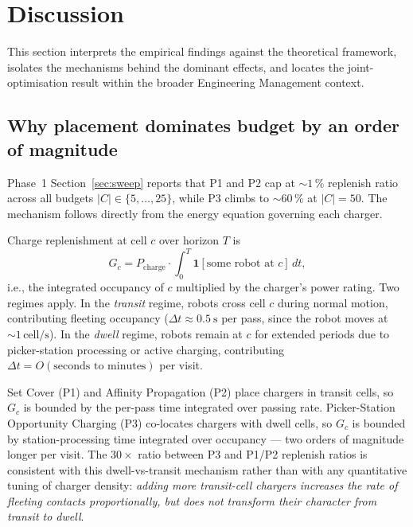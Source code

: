 \documentclass[conference]{IEEEtran}
\begin{document}
\section{Discussion}
\label{sec:discussion}

This section interprets the empirical findings against the theoretical framework, isolates the mechanisms behind the dominant effects, and locates the joint-optimisation result within the broader Engineering Management context.

\subsection{Why placement dominates budget by an order of magnitude}
\label{sec:mech_placement}

Phase~1 Section~\ref{sec:sweep} reports that P1 and P2 cap at $\sim 1\,\%$ replenish ratio across all budgets $|C| \in \{5, \ldots, 25\}$, while P3 climbs to $\sim 60\,\%$ at $|C|=50$. The mechanism follows directly from the energy equation governing each charger.

Charge replenishment at cell $c$ over horizon $T$ is
\begin{equation}
  G_c = P_\text{charge} \cdot \int_0^T \mathbf{1}[\text{some robot at } c]\,dt,
\end{equation}
i.e., the integrated occupancy of $c$ multiplied by the charger's power rating. Two regimes apply. In the \emph{transit} regime, robots cross cell $c$ during normal motion, contributing fleeting occupancy ($\Delta t \approx \SI{0.5}{\second}$ per pass, since the robot moves at $\sim 1\,\text{cell/s}$). In the \emph{dwell} regime, robots remain at $c$ for extended periods due to picker-station processing or active charging, contributing $\Delta t = O(\text{seconds to minutes})$ per visit.

Set Cover (P1) and Affinity Propagation (P2) place chargers in transit cells, so $G_c$ is bounded by the per-pass time integrated over passing rate. Picker-Station Opportunity Charging (P3) co-locates chargers with dwell cells, so $G_c$ is bounded by station-processing time integrated over occupancy --- two orders of magnitude longer per visit. The $30{\times}$ ratio between P3 and P1/P2 replenish ratios is consistent with this dwell-vs-transit mechanism rather than with any quantitative tuning of charger density: \emph{adding more transit-cell chargers increases the rate of fleeting contacts proportionally, but does not transform their character from transit to dwell}.
\end{document}
